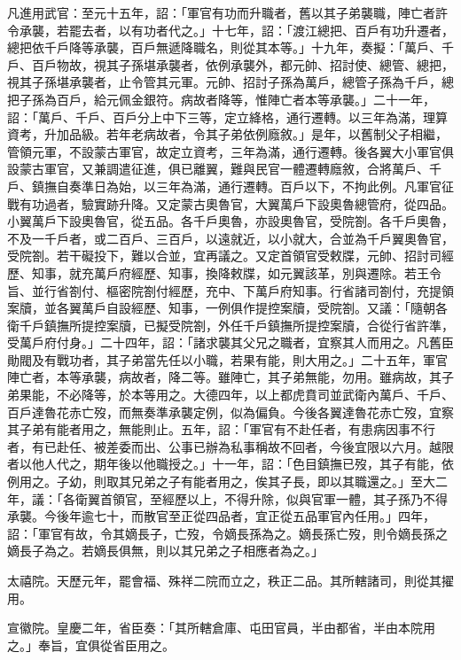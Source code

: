 \begin{pinyinscope}
 凡進用武官：至元十五年，詔：「軍官有功而升職者，舊以其子弟襲職，陣亡者許令承襲，若罷去者，以有功者代之。」十七年，詔：「渡江總把、百戶有功升遷者，總把依千戶降等承襲，百戶無遞降職名，則從其本等。」十九年，奏擬：「萬戶、千戶、百戶物故，視其子孫堪承襲者，依例承襲外，都元帥、招討使、總管、總把，視其子孫堪承襲者，止令管其元軍。元帥、招討子孫為萬戶，總管子孫為千戶，總把子孫為百戶，給元佩金銀符。病故者降等，惟陣亡者本等承襲。」二十一年，詔：「萬戶、千戶、百戶分上中下三等，定立絳格，通行遷轉。以三年為滿，理算資考，升加品級。若年老病故者，令其子弟依例廕敘。」是年，以舊制父子相繼，管領元軍，不設蒙古軍官，故定立資考，三年為滿，通行遷轉。後各翼大小軍官俱設蒙古軍官，又兼調遣征進，俱已離翼，難與民官一體遷轉廕敘，合將萬戶、千戶、鎮撫自奏準日為始，以三年為滿，通行遷轉。百戶以下，不拘此例。凡軍官征戰有功過者，驗實跡升降。又定蒙古奧魯官，大翼萬戶下設奧魯總管府，從四品。小翼萬戶下設奧魯官，從五品。各千戶奧魯，亦設奧魯官，受院劄。各千戶奧魯，不及一千戶者，或二百戶、三百戶，以遠就近，以小就大，合並為千戶翼奧魯官，受院劄。若干礙投下，難以合並，宜再議之。又定首領官受敕牒，元帥、招討司經歷、知事，就充萬戶府經歷、知事，換降敕牒，如元翼該革，別與遷除。若王令旨、並行省劄付、樞密院劄付經歷，充中、下萬戶府知事。行省諸司劄付，充提領案牘，並各翼萬戶自設經歷、知事，一例俱作提控案牘，受院劄。又議：「隨朝各衛千戶鎮撫所提控案牘，已擬受院劄，外任千戶鎮撫所提控案牘，合從行省許準，受萬戶府付身。」二十四年，詔：「諸求襲其父兄之職者，宜察其人而用之。凡舊臣勛閥及有戰功者，其子弟當先任以小職，若果有能，則大用之。」二十五年，軍官陣亡者，本等承襲，病故者，降二等。雖陣亡，其子弟無能，勿用。雖病故，其子弟果能，不必降等，於本等用之。大德四年，以上都虎賁司並武衛內萬戶、千戶、百戶達魯花赤亡歿，而無奏準承襲定例，似為偏負。今後各翼達魯花赤亡歿，宜察其子弟有能者用之，無能則止。五年，詔：「軍官有不赴任者，有患病因事不行者，有已赴任、被差委而出、公事已辦為私事稱故不回者，今後宜限以六月。越限者以他人代之，期年後以他職授之。」十一年，詔：「色目鎮撫已歿，其子有能，依例用之。子幼，則取其兄弟之子有能者用之，俟其子長，即以其職還之。」至大二年，議：「各衛翼首領官，至經歷以上，不得升除，似與官軍一體，其子孫乃不得承襲。今後年逾七十，而散官至正從四品者，宜正從五品軍官內任用。」四年，詔：「軍官有故，令其嫡長子，亡歿，令嫡長孫為之。嫡長孫亡歿，則令嫡長孫之嫡長子為之。若嫡長俱無，則以其兄弟之子相應者為之。」



 太禧院。天歷元年，罷會福、殊祥二院而立之，秩正二品。其所轄諸司，則從其擢用。



 宣徽院。皇慶二年，省臣奏：「其所轄倉庫、屯田官員，半由都省，半由本院用之。」奉旨，宜俱從省臣用之。




\end{pinyinscope}
